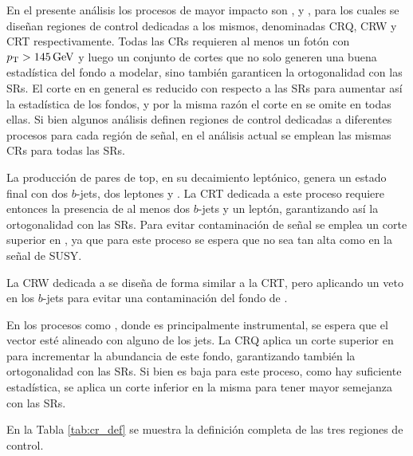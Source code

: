 En el presente análisis los procesos de mayor impacto son \phj, \wph y \ttbarph, para los cuales se diseñan regiones de control dedicadas a los mismos, denominadas CRQ, CRW y CRT respectivamente. Todas las CRs requieren al menos un fotón con $p_{\text{T}}>145\,\text{GeV}$ y luego un conjunto de cortes que no solo generen una buena estadística del fondo a modelar, sino también garanticen la ortogonalidad con las SRs. El corte en \HT en general es reducido con respecto a las SRs para aumentar así la estadística de los fondos, y por la misma razón el corte en \rtf se omite en todas ellas. 
Si bien algunos análisis definen regiones de control dedicadas a diferentes procesos para cada región de señal, en el análisis actual se emplean las mismas CRs para todas las SRs.

La producción de pares de top, en su decaimiento leptónico, genera un estado final con dos $b$-jets, dos leptones y \met. La CRT dedicada a este proceso requiere entonces la presencia de al menos dos $b$-jets y un leptón, garantizando así la ortogonalidad con las SRs. Para evitar contaminación de señal se emplea un corte superior en \met, ya que para este proceso se espera que no sea tan alta como en la señal de SUSY. 

La CRW dedicada a \wph se diseña de forma similar a la CRT, pero aplicando un veto en los $b$-jets para evitar una contaminación del fondo de \ttbarph.

En los procesos como \phj, donde \met es principalmente instrumental, se espera que el vector \met esté alineado con alguno de los jets. La CRQ aplica un corte superior en \dphijetmet para incrementar la abundancia de este fondo, garantizando también la ortogonalidad con las SRs. Si bien \met es baja para este proceso, como hay suficiente estadística, se aplica un corte inferior en la misma para tener mayor semejanza con las SRs.

En la Tabla \ref{tab:cr_def} se muestra la definición completa de las tres regiones de control. 



